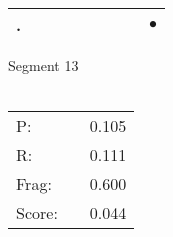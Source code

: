\documentclass[landscape]{article}
\newcommand{\ssp}{\hspace{2pt}}
\newcommand{\mex}{\cellcolor{g}$\bullet$}
\begin{document}
\begin{tabular}{|l|p{10pt}|p{10pt}|p{10pt}|p{10pt}|p{10pt}|p{10pt}|p{10pt}|p{10pt}|}
\hline
\ssp \cellcolor{ref7}. \ssp&\hspace{2pt}&\hspace{2pt}&\hspace{2pt}&\hspace{2pt}&\hspace{2pt}&\hspace{2pt}&\hspace{2pt}&\hspace{2pt}\mex\\
\hline
\end{tabular}

\vspace{6pt}
\noindent Segment 13\\\\
\noindent\begin{tabular}{lm{12pt}r}
\hline
P:&&0.105\\
R:&&0.111\\
Frag:&&0.600\\
Score:&&0.044\\
\end{tabular}

\newpage
\end{document}

